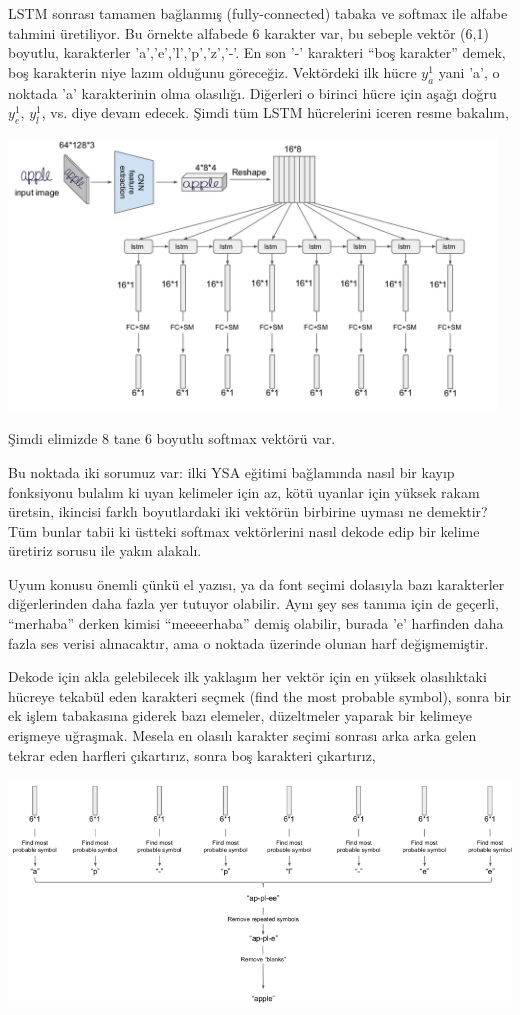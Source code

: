 \documentclass[12pt,fleqn]{article}\usepackage{../../common}
\begin{document}
LSTM sonrası tamamen bağlanmış (fully-connected) tabaka ve softmax ile
alfabe tahmini üretiliyor. Bu örnekte alfabede 6 karakter var, bu sebeple
vektör (6,1) boyutlu, karakterler 'a','e','l','p','z','-'. En son '-'
karakteri ``boş karakter'' demek, boş karakterin niye lazım olduğunu
göreceğiz. Vektördeki ilk hücre $y_a^1$ yani 'a', o noktada 'a'
karakterinin olma olasılığı. Diğerleri o birinci hücre için aşağı doğru
$y_e^1$, $y_l^1$, vs. diye devam edecek. Şimdi tüm LSTM hücrelerini iceren
resme bakalım,

\includegraphics[width=35em]{ocr_03.png}

Şimdi elimizde 8 tane 6 boyutlu softmax vektörü var. 

Bu noktada iki sorumuz var: ilki YSA eğitimi bağlamında nasıl bir kayıp
fonksiyonu bulalım ki uyan kelimeler için az, kötü uyanlar için yüksek
rakam üretsin, ikincisi farklı boyutlardaki iki vektörün birbirine uyması
ne demektir? Tüm bunlar tabii ki üstteki softmax vektörlerini nasıl dekode
edip bir kelime üretiriz sorusu ile yakın alakalı.

Uyum konusu önemli çünkü el yazısı, ya da font seçimi dolasıyla bazı
karakterler diğerlerinden daha fazla yer tutuyor olabilir. Aynı şey ses
tanıma için de geçerli, ``merhaba'' derken kimisi ``meeeerhaba'' demiş
olabilir, burada 'e' harfinden daha fazla ses verisi alınacaktır, ama o
noktada üzerinde olunan harf değişmemiştir.

Dekode için akla gelebilecek ilk yaklaşım her vektör için en yüksek
olasılıktaki hücreye tekabül eden karakteri seçmek (find the most probable
symbol), sonra bir ek işlem tabakasına giderek bazı elemeler, düzeltmeler
yaparak bir kelimeye erişmeye uğraşmak. Mesela en olasılı karakter seçimi
sonrası arka arka gelen tekrar eden harfleri çıkartırız, sonra boş
karakteri çıkartırız,

\includegraphics[width=37em]{ocr_04.png}
\end{document}
